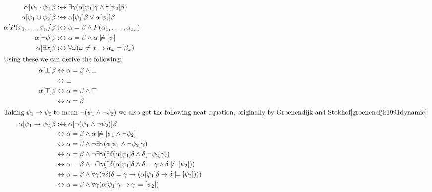 \documentclass[12pt]{article}
\begin{document}
\begin{align}
\alpha[\psi_1\cdot\psi_2]\beta &:\leftrightarrow \exists\gamma (\alpha[\psi_1]\gamma \wedge \gamma[\psi_2]\beta) \label{sem_and} \\
\alpha[\psi_1\cup\psi_2]\beta &:\leftrightarrow \alpha[\psi_1]\beta \vee \alpha[\psi_2]\beta \label{sem_or} \\
\alpha[P(x_1,\dots,x_n)]\beta &:\leftrightarrow \alpha = \beta \wedge P(\alpha_{x_1},\dots,\alpha_{x_n}) \label{sem_pred} \\
\alpha[\neg\psi]\beta &:\leftrightarrow \alpha = \beta \wedge \alpha\not\models[\psi] \label{sem_neg}\\
\alpha[\exists x]\beta &:\leftrightarrow \forall\omega (\omega \neq x \rightarrow \alpha_{\omega} = \beta_{\omega}) \label{sem_exists} \\
\intertext{Using these we can derive the following:}
\alpha[\bot]\beta &\leftrightarrow \alpha = \beta \wedge \bot \nonumber\\
                  &\leftrightarrow \bot \label{sem_bot}\\
\alpha[\top]\beta &\leftrightarrow \alpha = \beta \wedge \top \nonumber\\
                  &\leftrightarrow \alpha = \beta \label{sem_top}\\
\intertext{Taking $\psi_1\rightarrow\psi_2$ to mean $\neg(\psi_1\wedge\neg\psi_2)$ we also get the following neat equation, originally by Groenendijk and Stokhof\cite{groenendijk1991dynamic}:}
\alpha[\psi_1\rightarrow\psi_2]\beta
 &:\leftrightarrow \alpha[\neg(\psi_1\wedge\neg\psi_2)]\beta \nonumber\\
 &\leftrightarrow \alpha = \beta \wedge \alpha\not\models[\psi_1\wedge\neg\psi_2] \nonumber\\
 &\leftrightarrow \alpha = \beta \wedge \neg\exists\gamma(\alpha[\psi_1\wedge\neg\psi_2]\gamma) \nonumber\\
 &\leftrightarrow \alpha = \beta \wedge \neg\exists\gamma(\exists\delta(\alpha[\psi_1]\delta\wedge\delta[\neg\psi_2]\gamma)) \nonumber\\
 &\leftrightarrow \alpha = \beta \wedge \neg\exists\gamma(\exists\delta(\alpha[\psi_1]\delta\wedge\delta=\gamma\wedge\delta\not\models[\psi_2])) \nonumber\\
 &\leftrightarrow \alpha = \beta \wedge \forall\gamma(\forall\delta(\delta=\gamma\rightarrow(\alpha[\psi_1]\delta\rightarrow\delta\models[\psi_2]))) \nonumber\\
 &\leftrightarrow \alpha = \beta \wedge \forall\gamma(\alpha[\psi_1]\gamma\rightarrow\gamma\models[\psi_2]) \label{sem_impl}
\end{align}
\end{document}
